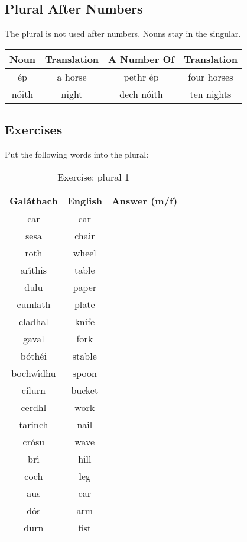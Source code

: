 \subsection{Plural After Numbers}

The plural is not used after numbers. Nouns stay in the singular.
\begin{table}[H]
\centering
\begin{tabu}{c|c|c|c}
  \textbf{Noun} & \textbf{Translation} & \textbf{A Number Of} & \textbf{Translation}\\
  \toprule
  \'{e}p & a horse & pethr \'{e}p & four horses\\
  n\'{o}ith & night & dech n\'{o}ith & ten nights
\end{tabu}
\label{example_plural_one_whole}
\end{table}

\newpage
\subsection{Exercises}

Put the following words into the plural:
\begin{table}[H]
\centering
\begin{tabu}{|c|c|p{10.0cm}|}
  \toprule
  \textbf{Gal\'{a}thach} & \textbf{English} & \textbf{Answer (m/f)}\\
  \toprule
  car & car & \\
  \midrule
  sesa & chair & \\
  \midrule
  roth & wheel & \\
  \midrule
  ar\'{\i}this & table & \\
  \midrule
  dulu & paper & \\
  \midrule
  cumlath & plate & \\
  \midrule
  cladhal & knife & \\
  \midrule
  gaval & fork & \\
  \midrule
  b\'{o}th\'{e}i & stable & \\
  \midrule
  bochw\'{\i}dhu & spoon & \\
  \midrule
  cilurn & bucket & \\
  \midrule
  cerdhl & work & \\
  \midrule
  tarinch & nail & \\
  \midrule
  cr\'{o}su & wave & \\
  \midrule
  br\'{\i} & hill & \\
  \midrule
  coch & leg & \\
  \midrule
  aus & ear & \\
  \midrule
  d\'{o}s & arm & \\
  \midrule
  durn & fist & \\
  \bottomrule
\end{tabu}
\label{exercise_plural_1}
\caption{Exercise: plural 1}
\end{table}

